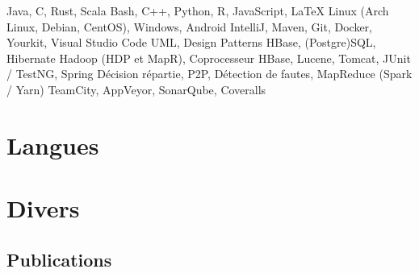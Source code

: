 \documentclass[11pt,a4paper,sans]{moderncv}
\begin{document}
       {
            Java,
            C,
            Rust,
            Scala
       }
       {
            Bash,
            C++,
            Python,
            R,
            JavaScript,
            LaTeX
       }
       {
            Linux (Arch Linux, Debian, CentOS),
            Windows,
            Android
       }
       {
            IntelliJ,
            Maven,
            Git,
            Docker,
            Yourkit,
            Visual Studio Code
       }
       {
            UML,
            Design Patterns
       }
       {
            HBase,
            (Postgre)SQL,
            Hibernate
       }
       {
            Hadoop (HDP et MapR),
            Coprocesseur HBase,
            Lucene,
            Tomcat,
            JUnit / TestNG,
            Spring
       }
       {
            Décision répartie,
            P2P,
            Détection de fautes,
            MapReduce (Spark / Yarn)
       }
       {
            TeamCity,
            AppVeyor,
            SonarQube,
            Coveralls
       }

\vspace{0.5em}


\section{Langues}
\vspace{1em}


\vspace{0.5em}


\section{Divers}
\vspace{0.3em}

\subsection{Publications}
\vspace{1em}
\end{document}
